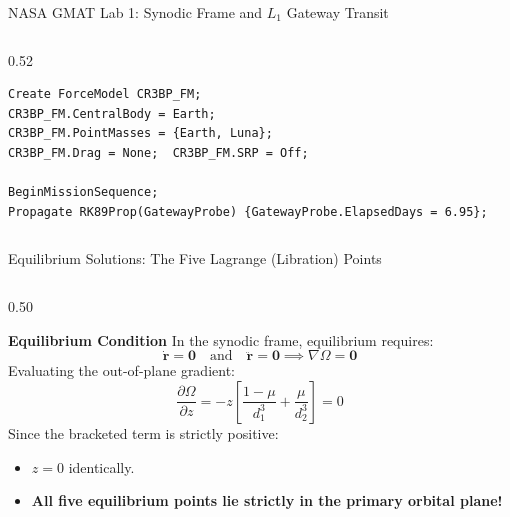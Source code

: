 \documentclass[aspectratio=169, 10pt]{beamer}
\begin{document}
\begin{frame}[fragile]{NASA GMAT Lab 1: Synodic Frame and $L_1$ Gateway Transit}
\begin{columns}[t]
\begin{column}{0.52\textwidth}
\begin{lstlisting}[style=gmatstyle]
% 3. Pure CR3BP Point-Mass Force Model
Create ForceModel CR3BP_FM;
CR3BP_FM.CentralBody = Earth;
CR3BP_FM.PointMasses = {Earth, Luna};
CR3BP_FM.Drag = None;  CR3BP_FM.SRP = Off;

BeginMissionSequence;
Propagate RK89Prop(GatewayProbe) {GatewayProbe.ElapsedDays = 6.95};
\end{lstlisting}
        \end{column}
    \end{columns}
\end{frame}

\begin{frame}{Equilibrium Solutions: The Five Lagrange (Libration) Points}
    \begin{columns}[t]
        \begin{column}{0.50\textwidth}
            \begin{block}{\textbf{Equilibrium Condition}}
                \scriptsize
                In the synodic frame, equilibrium requires:
                \begin{equation*}
                    \dot{\mathbf{r}} = \mathbf{0} \quad \text{and} \quad \ddot{\mathbf{r}} = \mathbf{0} \implies \nabla \Omega = \mathbf{0}
                \end{equation*}
                Evaluating the out-of-plane gradient:
                \begin{equation*}
                    \frac{\partial \Omega}{\partial z} = -z\left[\frac{1-\mu}{d_1^3} + \frac{\mu}{d_2^3}\right] = 0
                \end{equation*}
                Since the bracketed term is strictly positive:
                \begin{itemize}\setlength{\itemsep}{1.5pt}
                    \item $z = 0$ identically.
                    \item \textbf{All five equilibrium points lie strictly in the primary orbital plane!}
                \end{itemize}
            \end{block}
        \end{column}
        

\end{columns}
\end{frame}
\end{document}
